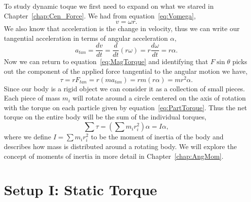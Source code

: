\documentclass[main.tex]{subfiles}
\begin{document}
To study dynamic toque we first need to expand on what we stared in Chapter~\ref{chap:Cen_Force}. We had from equation~\eqref{eq:Vomega},
\begin{equation}\label{eq:Vomega_Torque}
v=\omega r.
\end{equation}
We also know that acceleration is the change in velocity, thus we can write our tangential acceleration in terms of angular acceleration $\alpha,$
\begin{equation}\label{eq:Aalpha}
a_{tan}=\frac{dv}{dt}=\frac{d}{dt}(r\omega)=r\frac{d\omega}{dt}=r\alpha.
\end{equation}
Now we can return to equation~\eqref{eq:MagTorque} and identifying that $F\sin\theta$ picks out the component of the applied force tangential to the angular motion we have,
\begin{equation}\label{eq:PartTorque}
\tau=rF_{tan}=r(ma_{tan})=rm(r\alpha)=mr^2\alpha.
\end{equation}
Since our body is a rigid object we can consider it as a collection of small pieces. Each piece of mass $m_i$ will rotate around a circle centered on the axis of rotation with the torque on each particle given by equation~\eqref{eq:PartTorque}. Thus the net torque on the entire body will be the sum of the individual torques,
\begin{equation} \label{eq:TorqueIalpha}
\sum \tau=\left(\sum m_ir_i^2\right)\alpha=I\alpha,
\end{equation}
where we define $I=\sum m_ir_i^2$ to be the moment of inertia of the body and describes how mass is distributed around a rotating body. We will explore the concept of moments of inertia in more detail in Chapter~\ref{chap:AngMom}.

\section{Setup I: Static Torque}
\end{document}
